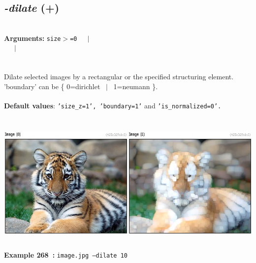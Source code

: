 \documentclass[a4paper,11pt,twoside]{book}
\begin{document}
\subsection{\emph{-dilate} (+)}\vspace*{-0.5em}
~\\\textbf{Arguments: } 
{\small \texttt{size$>$=0}}~~~$|$\\
~~~$|$\\
\\~\\
Dilate selected images by a rectangular or the specified structuring element.
~\\'boundary' can be \{ 0=dirichlet ~$|$~ 1=neumann \}.
~\\~\\\textbf{Default values}: {\small \texttt{'size\_z=1', 'boundary=1'} and \texttt{'is\_normalized=0'.}}
\begin{center}\includegraphics[keepaspectratio=true,height=7cm,width=\textwidth]{img/gmic_def268.jpg}\\
{\footnotesize \textbf{Example 268~:} \texttt{image.jpg --dilate 10}}
\end{center}
\end{document}
